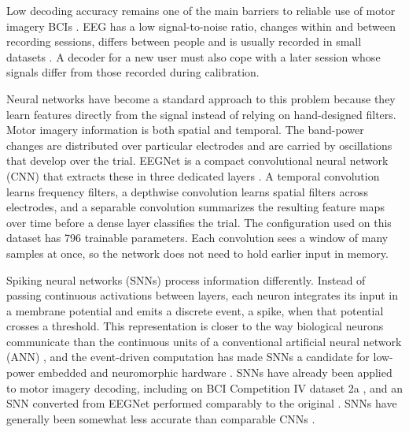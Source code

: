 \documentclass[conference]{IEEEtran}
\begin{document}
Low decoding accuracy remains one of the main barriers to reliable use of motor imagery BCIs \cite{padfield2019}. EEG has a low signal-to-noise ratio, changes within and between recording sessions, differs between people and is usually recorded in small datasets \cite{padfield2019}. A decoder for a new user must also cope with a later session whose signals differ from those recorded during calibration.

Neural networks have become a standard approach to this problem because they learn features directly from the signal instead of relying on hand-designed filters. Motor imagery information is both spatial and temporal. The band-power changes are distributed over particular electrodes and are carried by oscillations that develop over the trial. EEGNet is a compact convolutional neural network (CNN) that extracts these in three dedicated layers \cite{lawhern2018}. A temporal convolution learns frequency filters, a depthwise convolution learns spatial filters across electrodes, and a separable convolution summarizes the resulting feature maps over time before a dense layer classifies the trial. The configuration used on this dataset has 796 trainable parameters. Each convolution sees a window of many samples at once, so the network does not need to hold earlier input in memory.

Spiking neural networks (SNNs) process information differently. Instead of passing continuous activations between layers, each neuron integrates its input in a membrane potential and emits a discrete event, a spike, when that potential crosses a threshold. This representation is closer to the way biological neurons communicate than the continuous units of a conventional artificial neural network (ANN) \cite{maass1997}, and the event-driven computation has made SNNs a candidate for low-power embedded and neuromorphic hardware \cite{liao2025,zhang2025}. SNNs have already been applied to motor imagery decoding, including on BCI Competition IV dataset 2a \cite{liao2025,chen2026,zhang2025}, and an SNN converted from EEGNet performed comparably to the original \cite{chen2026}. SNNs have generally been somewhat less accurate than comparable CNNs \cite{zhang2025}.
\end{document}
